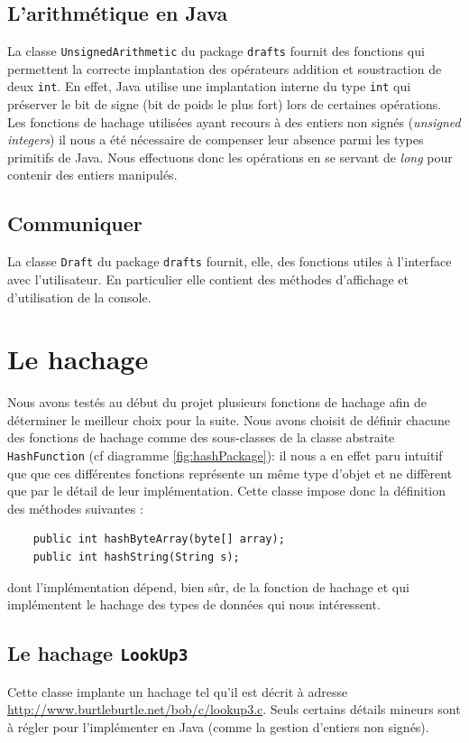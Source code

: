 \documentclass[12pt,a4paper,titlepage]{article}
\newcommand{\class}[1]{\texttt{#1}}
\begin{document}
\subsection*{L'arithmétique en Java}
La classe \class{UnsignedArithmetic} du package \class{drafts} fournit des fonctions qui permettent la correcte implantation des opérateurs addition et soustraction de deux \class{int}. En effet, Java utilise une implantation interne du type \class{int} qui préserver le bit de signe (bit de poids le plus fort) lors de certaines opérations. Les fonctions de hachage utilisées ayant recours à des entiers non signés (\textit{unsigned integers}) il nous a été nécessaire de compenser leur absence parmi les types primitifs de Java. Nous effectuons donc les opérations en se servant de \textit{long} pour contenir des entiers manipulés.

\subsection*{Communiquer}
La classe \class{Draft} du package \class{drafts} fournit, elle, des fonctions utiles à l'interface avec l'utilisateur. En particulier elle contient des méthodes d'affichage et d'utilisation de la console.




\newpage
\section{Le hachage}


Nous avons testés au début du projet plusieurs fonctions de hachage afin de déterminer le meilleur choix pour la suite. Nous avons choisit de définir chacune des fonctions de hachage comme des sous-classes de la classe abstraite \class{HashFunction} (cf diagramme \ref{fig:hashPackage}): il nous a en effet paru intuitif que que ces différentes fonctions représente un même type d'objet et ne diffèrent que par le détail de leur implémentation. Cette classe impose donc la définition des méthodes suivantes :
\begin{lstlisting}
	public int hashByteArray(byte[] array);
	public int hashString(String s);
\end{lstlisting}
dont l'implémentation dépend, bien sûr, de la fonction de hachage et qui implémentent le hachage des types de données qui nous intéressent. 

\subsection{Le hachage \class{LookUp3}}
Cette classe implante un hachage tel qu'il est décrit à adresse \href{http://www.burtleburtle.net/bob/c/lookup3.c}{http://www.burtleburtle.net/bob/c/lookup3.c}. Seuls certains détails mineurs sont à régler pour l'implémenter en Java (comme la gestion d'entiers non signés).
\end{document}
